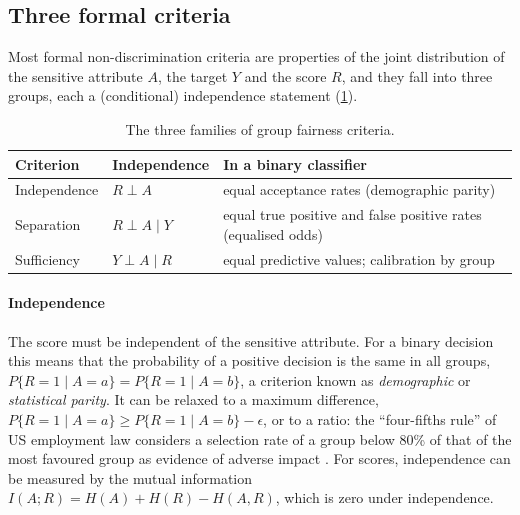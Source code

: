 \subsection{Three formal criteria}

Most formal non-discrimination criteria are properties of the joint distribution of the
sensitive attribute $A$, the target $Y$ and the score $R$, and they fall into three groups, each a
(conditional) independence statement \citep{barocas2023fairness} (\cref{tab:faircriteria}).

\begin{table}[htbp]
\centering\small
\caption{The three families of group fairness criteria.}\label{tab:faircriteria}
\begin{tabularx}{\textwidth}{@{}llX@{}}
\toprule
Criterion & Independence & In a binary classifier\\
\midrule
Independence & $R\perp A$ & equal acceptance rates (demographic parity)\\
Separation & $R\perp A\mid Y$ & equal true positive and false positive rates (equalised odds)\\
Sufficiency & $Y\perp A\mid R$ & equal predictive values; calibration by group\\
\bottomrule
\end{tabularx}
\end{table}

\paragraph{Independence} The score must be independent of the sensitive attribute. For a binary
decision this means that the probability of a positive decision is the same in all groups,
$P\{R=1\mid A=a\}=P\{R=1\mid A=b\}$, a criterion known as \emph{demographic} or
\emph{statistical parity}. It can be relaxed to a maximum difference,
$P\{R=1\mid A=a\}\geq P\{R=1\mid A=b\}-\epsilon$, or to a ratio: the ``four-fifths rule'' of US
employment law considers a selection rate of a group below 80\% of that of the most favoured group
as evidence of adverse impact \citep{feldman2015certifying}. For scores, independence can be
measured by the mutual information $I(A;R)=H(A)+H(R)-H(A,R)$, which is zero under independence.

